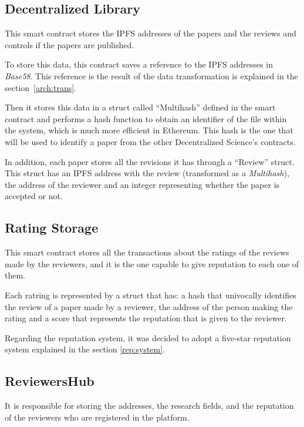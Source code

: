 \subsection*{Decentralized Library}
\label{sec:decentr-libr}

This smart contract stores the IPFS addresses of the papers and the reviews and
controls if the papers are published.

To store this data, this contract saves a reference to the IPFS addresses in
\emph{Base58}. This reference is the result of the data transformation is
explained in the section~\ref{arch:trans}.

Then it stores this data in a struct called ``Multihash'' defined in the smart
contract and performs a hash function to obtain an identifier of the file within
the system, which is much more efficient in Ethereum. This hash is the one that
will be used to identify a paper from the other Decentralized Science's
contracts.

In addition, each paper stores all the revisions it has through a ``Review''
struct. This struct has an IPFS address with the review (transformed as a
\emph{Multihash}), the address of the reviewer and an integer representing
whether the paper is accepted or not.

\subsection*{Rating Storage}
\label{sec:rating-storage}

This smart contract stores all the transactions about the ratings of the reviews
made by the reviewers, and it is the one capable to give reputation to each one
of them.

Each ratring is represented by a struct that has: a hash that univocally
identifies the review of a paper made by a reviewer, the address of the person
making the rating and a score that represents the reputation that is given to
the reviewer.

Regarding the reputation system, it was decided to adopt a five-star reputation
system explained in the section \ref{rep:system}.

\subsection*{ReviewersHub}
\label{sec:reviewershub}

It is responsible for storing the addresses, the research fields, and the
reputation of the reviewers who are registered in the platform.

